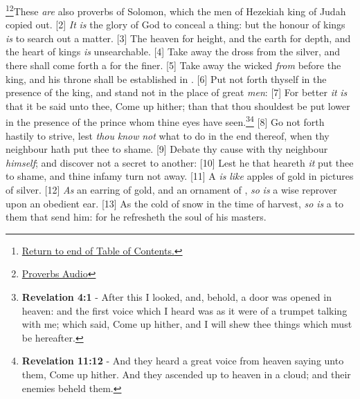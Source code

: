 \footnote{\textcolor[cmyk]{0.99998,1,0,0}{\hyperlink{TOC}{Return to end of Table of Contents.}}}\footnote{\href{https://www.audioverse.org/english/audiobibles/books/ENGKJV/O/Prov/1}{\textcolor[cmyk]{0.99998,1,0,0}{Proverbs Audio}}}\textcolor[cmyk]{0.99998,1,0,0}{These \emph{are} also proverbs of Solomon, which the men of Hezekiah king of Judah copied out.}
[2] \textcolor[cmyk]{0.99998,1,0,0}{\emph{It} \emph{is} the glory of God to conceal a thing: but the honour of kings \emph{is} to search out a matter.}
[3] \textcolor[cmyk]{0.99998,1,0,0}{The heaven for height, and the earth for depth, and the heart of kings \emph{is} unsearchable.}
[4] \textcolor[cmyk]{0.99998,1,0,0}{Take away the dross from the silver, and there shall come forth a  for the finer.}
[5] \textcolor[cmyk]{0.99998,1,0,0}{Take away the wicked \emph{from} before the king, and his throne shall be established in .}
[6] \textcolor[cmyk]{0.99998,1,0,0}{Put not forth thyself in the presence of the king, and stand not in the place of great \emph{men}:}
[7] \textcolor[cmyk]{0.99998,1,0,0}{For better \emph{it} \emph{is} that it be said unto thee, Come up hither; than that thou shouldest be put lower in the presence of the prince whom thine eyes have seen.}\footnote{\textbf{Revelation 4:1} - After this I looked, and, behold, a door was opened in heaven: and the first voice which I heard was as it were of a trumpet talking with me; which said, Come up hither, and I will shew thee things which must be hereafter.}\footnote{\textbf{Revelation 11:12} - And they heard a great voice from heaven saying unto them, Come up hither. And they ascended up to heaven in a cloud; and their enemies beheld them.}
[8] \textcolor[cmyk]{0.99998,1,0,0}{Go not forth hastily to strive, lest \emph{thou} \emph{know} \emph{not} what to do in the end thereof, when thy neighbour hath put thee to shame.}
[9] \textcolor[cmyk]{0.99998,1,0,0}{Debate thy cause with thy neighbour \emph{himself}; and discover not a secret to another:}
[10] \textcolor[cmyk]{0.99998,1,0,0}{Lest he that heareth \emph{it} put thee to shame, and thine infamy turn not away.}
[11] \textcolor[cmyk]{0.99998,1,0,0}{A  \emph{is} \emph{like} apples of gold in pictures of silver.}
[12] \textcolor[cmyk]{0.99998,1,0,0}{\emph{As} an earring of gold, and an ornament of , \emph{so} \emph{is} a wise reprover upon an obedient ear.}
[13] \textcolor[cmyk]{0.99998,1,0,0}{As the cold of snow in the time of harvest, \emph{so} \emph{is} a  to them that send him: for he refresheth the soul of his masters.}
